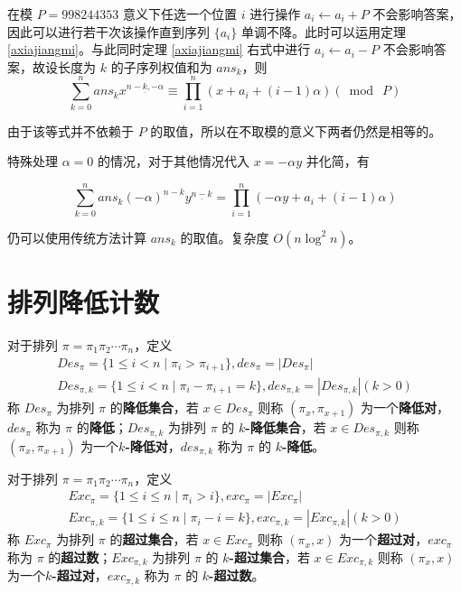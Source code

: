 \documentclass{noithesis}
\begin{document}
	在模 $P=998244353$ 意义下任选一个位置 $i$ 进行操作 $a_i \leftarrow a_i + P$ 不会影响答案，因此可以进行若干次该操作直到序列 $\{a_i\}$ 单调不降。此时可以运用定理 \ref{axiajiangmi}。与此同时定理 \ref{axiajiangmi} 右式中进行 $a_i\leftarrow a_i - P$ 不会影响答案，故设长度为 $k$ 的子序列权值和为 $ans_k$，则 $$\sum_{k=0}^n ans_k x^{\underline{n-k,-\alpha}} \equiv \prod_{i=1}^n (x+a_i+(i-1)\alpha)(\bmod\ P)$$
	
	由于该等式并不依赖于 $P$ 的取值，所以在不取模的意义下两者仍然是相等的。
	
	特殊处理 $\alpha = 0$ 的情况，对于其他情况代入 $x=-\alpha y$ 并化简，有
	
	$$\sum_{k=0}^n ans_k(-\alpha)^{n-k} y^{\underline{n-k}} = \prod_{i=1}^n (-\alpha y+a_i+(i-1)\alpha)$$
	
	仍可以使用传统方法计算 $ans_k$ 的取值。复杂度 $O(n \log^2 n)$。
	
	\section{排列降低计数}
	\begin{definition}[降低]
		对于排列 $\pi = \pi_1\pi_2\cdots\pi_n$，定义\begin{gather*}
		Des_{\pi} = \{1 \leq i < n \mid \pi_i > \pi_{i+1}\} , des_{\pi} = |Des_{\pi}| \\
		Des_{\pi,k} = \{1 \leq i < n \mid \pi_i - \pi_{i+1} = k \} , des_{\pi , k} = |Des_{\pi,k}|(k > 0)
		\end{gather*}
		称 $Des_{\pi}$ 为排列 $\pi$ 的\textbf{降低集合}，若 $x \in Des_{\pi}$ 则称 $(\pi_x,\pi_{x+1})$ 为一个\textbf{降低对}，$des_{\pi}$ 称为 $\pi$ 的\textbf{降低}；$Des_{\pi,k}$ 为排列 $\pi$ 的 \textbf {$k$-降低集合}，若 $x \in Des_{\pi,k}$ 则称 $(\pi_x,\pi_{x+1})$ 为一个\textbf {$k$-降低对}，$des_{\pi,k}$ 称为 $\pi$ 的 \textbf{$k$-降低}。
	\end{definition}
	\begin{definition}[超过数]
		对于排列 $\pi = \pi_1\pi_2\cdots\pi_n$，定义\begin{gather*}
		Exc_{\pi} = \{1 \leq i \leq n \mid \pi_i > i \} , exc_{\pi} = |Exc_{\pi}| \\
		Exc_{\pi,k} = \{1 \leq i \leq n \mid \pi_i - i = k \} , exc_{\pi , k} = |Exc_{\pi,k}|(k > 0)
		\end{gather*}
		称 $Exc_{\pi}$ 为排列 $\pi$ 的\textbf{超过集合}，若 $x \in Exc_{\pi}$ 则称 $(\pi_x,x)$ 为一个\textbf{超过对}，$exc_{\pi}$ 称为 $\pi$ 的\textbf{超过数}；$Exc_{\pi,k}$ 为排列 $\pi$ 的 \textbf{$k$-超过集合}，若 $x \in Exc_{\pi,k}$ 则称 $(\pi_x,x)$ 为一个\textbf{$k$-超过对}，$exc_{\pi,k}$ 称为 $\pi$ 的 \textbf{$k$-超过数}。
	\end{definition}
	
\end{document}
